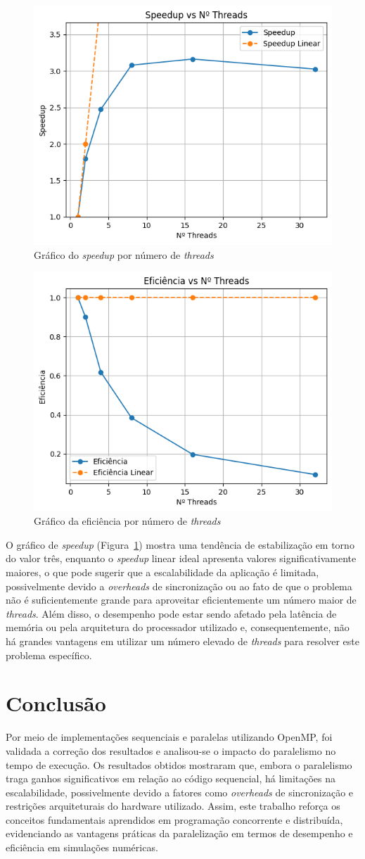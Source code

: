 \documentclass[12pt]{article}
\begin{document}
\begin{figure}[ht]
  \centering
  \includegraphics[width=.5\textwidth]{figs/speedupxthreads.png}
  \caption{Gráfico do \textit{speedup} por número de \textit{threads}}
  \label{fig:speedupOMP}
\end{figure}

\begin{figure}[ht]
  \centering
  \includegraphics[width=.5\textwidth]{figs/eficienciaxthreads.png}
  \caption{Gráfico da eficiência por número de \textit{threads}}
  \label{fig:eficienciaOMP}
\end{figure}

O gráfico de \textit{speedup} (Figura~\ref{fig:speedupOMP}) mostra uma
tendência de estabilização em torno do valor três, enquanto o \textit{speedup}
linear ideal apresenta valores significativamente maiores, o que pode sugerir
que a escalabilidade da aplicação é limitada, possivelmente devido a
\textit{overheads} de sincronização ou ao fato de que o problema não é
suficientemente grande para aproveitar eficientemente um número maior de
\textit{threads}. Além disso, o desempenho pode estar sendo afetado pela
latência de memória ou pela arquitetura do processador utilizado e,
consequentemente, não há grandes vantagens em utilizar um número elevado de
\textit{threads} para resolver este problema específico.

\section{Conclusão}
Por meio de implementações sequenciais e paralelas utilizando OpenMP, foi
validada a correção dos resultados e analisou-se o impacto do paralelismo no
tempo de execução. Os resultados obtidos mostraram que, embora o paralelismo
traga ganhos significativos em relação ao código sequencial, há limitações na
escalabilidade, possivelmente devido a fatores como \textit{overheads} de
sincronização e restrições arquiteturais do hardware utilizado. Assim, este
trabalho reforça os conceitos fundamentais aprendidos em programação
concorrente e distribuída, evidenciando as vantagens práticas da paralelização
em termos de desempenho e eficiência em simulações numéricas. 




\nocite{*}
\end{document}
